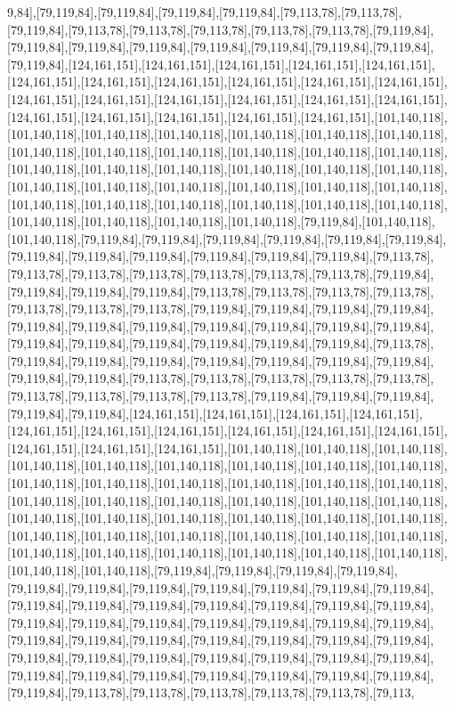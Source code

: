 9,84],[79,119,84],[79,119,84],[79,119,84],[79,119,84],[79,113,78],[79,113,78],[79,119,84],[79,113,78],[79,113,78],[79,113,78],[79,113,78],[79,113,78],[79,119,84],[79,119,84],[79,119,84],[79,119,84],[79,119,84],[79,119,84],[79,119,84],[79,119,84],[79,119,84],[124,161,151],[124,161,151],[124,161,151],[124,161,151],[124,161,151],[124,161,151],[124,161,151],[124,161,151],[124,161,151],[124,161,151],[124,161,151],[124,161,151],[124,161,151],[124,161,151],[124,161,151],[124,161,151],[124,161,151],[124,161,151],[124,161,151],[124,161,151],[124,161,151],[124,161,151],[101,140,118],[101,140,118],[101,140,118],[101,140,118],[101,140,118],[101,140,118],[101,140,118],[101,140,118],[101,140,118],[101,140,118],[101,140,118],[101,140,118],[101,140,118],[101,140,118],[101,140,118],[101,140,118],[101,140,118],[101,140,118],[101,140,118],[101,140,118],[101,140,118],[101,140,118],[101,140,118],[101,140,118],[101,140,118],[101,140,118],[101,140,118],[101,140,118],[101,140,118],[101,140,118],[101,140,118],[101,140,118],[101,140,118],[101,140,118],[101,140,118],[79,119,84],[101,140,118],[101,140,118],[79,119,84],[79,119,84],[79,119,84],[79,119,84],[79,119,84],[79,119,84],[79,119,84],[79,119,84],[79,119,84],[79,119,84],[79,119,84],[79,119,84],[79,113,78],[79,113,78],[79,113,78],[79,113,78],[79,113,78],[79,113,78],[79,113,78],[79,119,84],[79,119,84],[79,119,84],[79,119,84],[79,113,78],[79,113,78],[79,113,78],[79,113,78],[79,113,78],[79,113,78],[79,113,78],[79,119,84],[79,119,84],[79,119,84],[79,119,84],[79,119,84],[79,119,84],[79,119,84],[79,119,84],[79,119,84],[79,119,84],[79,119,84],[79,119,84],[79,119,84],[79,119,84],[79,119,84],[79,119,84],[79,119,84],[79,113,78],[79,119,84],[79,119,84],[79,119,84],[79,119,84],[79,119,84],[79,119,84],[79,119,84],[79,119,84],[79,119,84],[79,113,78],[79,113,78],[79,113,78],[79,113,78],[79,113,78],[79,113,78],[79,113,78],[79,113,78],[79,113,78],[79,119,84],[79,119,84],[79,119,84],[79,119,84],[79,119,84],[124,161,151],[124,161,151],[124,161,151],[124,161,151],[124,161,151],[124,161,151],[124,161,151],[124,161,151],[124,161,151],[124,161,151],[124,161,151],[124,161,151],[124,161,151],[101,140,118],[101,140,118],[101,140,118],[101,140,118],[101,140,118],[101,140,118],[101,140,118],[101,140,118],[101,140,118],[101,140,118],[101,140,118],[101,140,118],[101,140,118],[101,140,118],[101,140,118],[101,140,118],[101,140,118],[101,140,118],[101,140,118],[101,140,118],[101,140,118],[101,140,118],[101,140,118],[101,140,118],[101,140,118],[101,140,118],[101,140,118],[101,140,118],[101,140,118],[101,140,118],[101,140,118],[101,140,118],[101,140,118],[101,140,118],[101,140,118],[101,140,118],[101,140,118],[101,140,118],[101,140,118],[101,140,118],[101,140,118],[79,119,84],[79,119,84],[79,119,84],[79,119,84],[79,119,84],[79,119,84],[79,119,84],[79,119,84],[79,119,84],[79,119,84],[79,119,84],[79,119,84],[79,119,84],[79,119,84],[79,119,84],[79,119,84],[79,119,84],[79,119,84],[79,119,84],[79,119,84],[79,119,84],[79,119,84],[79,119,84],[79,119,84],[79,119,84],[79,119,84],[79,119,84],[79,119,84],[79,119,84],[79,119,84],[79,119,84],[79,119,84],[79,119,84],[79,119,84],[79,119,84],[79,119,84],[79,119,84],[79,119,84],[79,119,84],[79,119,84],[79,119,84],[79,119,84],[79,119,84],[79,119,84],[79,119,84],[79,119,84],[79,119,84],[79,113,78],[79,113,78],[79,113,78],[79,113,78],[79,113,78],[79,113,